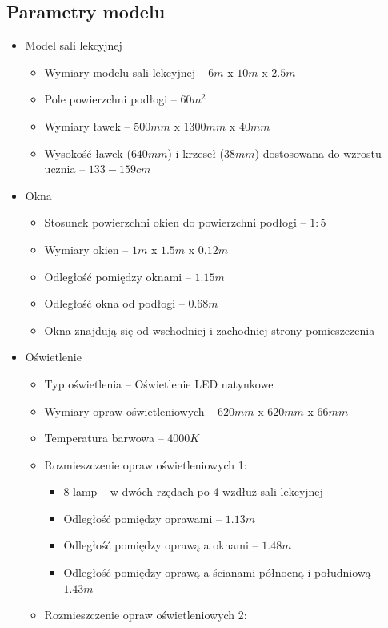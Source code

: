 \documentclass[a4paper,12pt]{article}
\begin{document}
	\subsection{Parametry modelu}
	\label{sec:parametry_modelu}
	
	\begin{itemize}
		\item Model sali lekcyjnej
		\begin{itemize}
			\item Wymiary modelu sali lekcyjnej -- $6m$ x $10m$ x $2.5m$
			\item Pole powierzchni podłogi -- $60m^2$
			\item Wymiary ławek -- $500mm$ x $1300mm$ x $40mm$
			\item Wysokość ławek ($640mm$) i krzeseł ($38mm$) dostosowana do wzrostu ucznia -- $133-159cm$
		\end{itemize}
		\item Okna
		\begin{itemize}
			\item Stosunek powierzchni okien do powierzchni podłogi -- $1:5$
			\item Wymiary okien -- $1m$ x $1.5m$ x $0.12m$
			\item Odległość pomiędzy oknami -- $1.15m$
			\item Odległość okna od podłogi -- $0.68m$
			\item Okna znajdują się od wschodniej i zachodniej strony pomieszczenia
		\end{itemize}
		\item Oświetlenie
		\begin{itemize}
			\item Typ oświetlenia -- Oświetlenie LED natynkowe
			\item Wymiary opraw oświetleniowych -- $620mm$ x $620mm$ x $66mm$
			\item Temperatura barwowa -- $4000K$
			\item Rozmieszczenie opraw oświetleniowych 1:
			\begin{itemize}
				\item 8 lamp -- w dwóch rzędach po 4 wzdłuż sali lekcyjnej
				\item Odległość pomiędzy oprawami -- $1.13m$
				\item Odległość pomiędzy oprawą a oknami -- $1.48m$
				\item Odległość pomiędzy oprawą a ścianami północną i południową -- $1.43m$
			\end{itemize}
				\item Rozmieszczenie opraw oświetleniowych 2:

\end{itemize}
\end{itemize}
\end{document}
